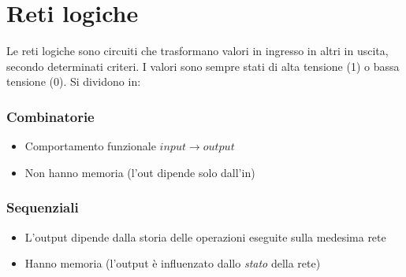 \section{Reti logiche}
Le reti logiche sono circuiti che trasformano valori in ingresso in altri in uscita, secondo determinati criteri. I valori sono sempre stati di alta tensione (1) o bassa tensione (0). Si dividono in:
\begin{minipage}[t]{0.48\textwidth}
	\subsubsection*{Combinatorie}
	\begin{itemize}
		\item Comportamento funzionale $ input \rightarrow  output $
		\item Non hanno memoria (l'out dipende solo dall'in)
	\end{itemize}
\end{minipage}
%
\begin{minipage}[t]{0.48\textwidth}
	\subsubsection*{Sequenziali}
	\begin{itemize}
		\item L'output dipende dalla storia delle operazioni eseguite sulla medesima rete
		\item Hanno memoria (l'output è influenzato dallo \textit{stato} della rete)
	\end{itemize}
\end{minipage}
